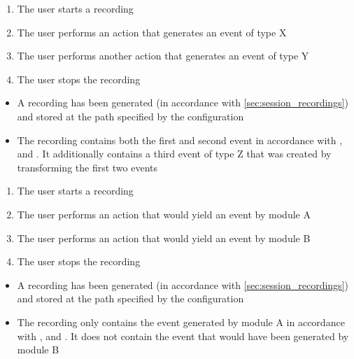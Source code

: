\begin{tests}
    {\begin{enumerate}
        \item The \gls{user} starts a recording
        \item The \gls{user} performs an action that generates an \gls{event} of type X
        \item The \gls{user} performs another action that generates an \gls{event} of type Y
        \item The \gls{user} stops the recording
    \end{enumerate}}
    {\begin{itemize}
        \item A recording has been generated (in accordance with \ref{sec:session_recordings}) and stored at the path specified by the configuration
        \item The recording contains both the first and second event in accordance with ,  and . It additionally contains a third event of type Z that was created by transforming the first two \glspl{event}
    \end{itemize}}

    {\begin{enumerate}
        \item The \gls{user} starts a recording
        \item The \gls{user} performs an action that would yield an \gls{event} by module A
        \item The \gls{user} performs an action that would yield an \gls{event} by module B
        \item The \gls{user} stops the recording
    \end{enumerate}}
    {\begin{itemize}
        \item A recording has been generated (in accordance with \ref{sec:session_recordings}) and stored at the path specified by the configuration
        \item The recording only contains the \gls{event} generated by module A in accordance with ,  and . It does not contain the \gls{event} that would have been generated by module B
    \end{itemize}}


\end{tests}

